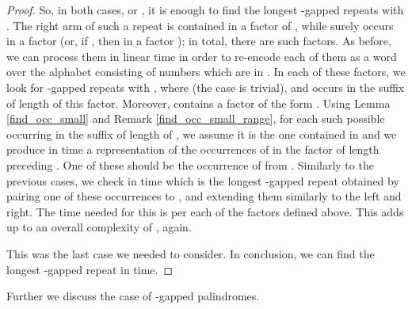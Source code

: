 \documentclass[final]{dmtcs-episciences}
\begin{document}
\begin{proof}
So, in both cases,  or , it is enough to find the longest -gapped repeats with . The right arm  of such a repeat is contained in a factor  of , while  surely occurs in a factor  (or, if , then in a factor ); in total, there are  such  factors. As before, we can process them in linear time in order to re-encode each of them as a word over the alphabet consisting of numbers which are in . In each of these factors, we look for -gapped repeats  with , where  (the case  is trivial), and  occurs in the suffix of length  of this factor. Moreover,  contains a factor  of the form . Using Lemma \ref{find_occ_small} and Remark \ref{find_occ_small_range}, 
for each such possible  occurring in the suffix of length  of , we assume it is the one contained in  and we produce in  time a representation of the  occurrences of  in the factor of length  preceding . One of these should be the occurrence of  from . Similarly to the previous cases, we check in  time which is the longest -gapped repeat obtained by pairing one of these occurrences to , and extending them similarly to the left and right. The time needed for this is  per each of the  factors  defined above. 
This adds up to an overall complexity of , again.

This was the last case we needed to consider. In conclusion, we can find the longest -gapped repeat  in  time.
\end{proof}

Further we discuss the case of -gapped palindromes.
\end{document}
